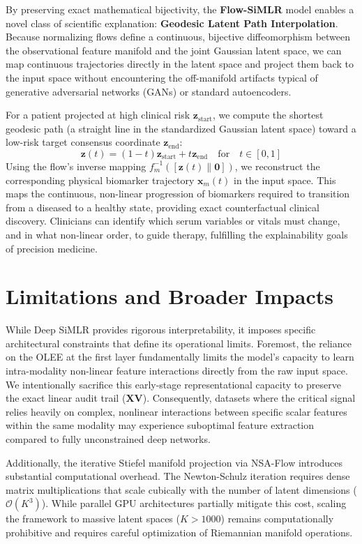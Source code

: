 \documentclass[
  letterpaper,
]{report}
\begin{document}
By preserving exact mathematical bijectivity, the \textbf{Flow-SiMLR}
model enables a novel class of scientific explanation: \textbf{Geodesic
Latent Path Interpolation}. Because normalizing flows define a
continuous, bijective diffeomorphism between the observational feature
manifold and the joint Gaussian latent space, we can map continuous
trajectories directly in the latent space and project them back to the
input space without encountering the off-manifold artifacts typical of
generative adversarial networks (GANs) or standard autoencoders.

For a patient projected at high clinical risk
\(\mathbf{z}_{\text{start}}\), we compute the shortest geodesic path (a
straight line in the standardized Gaussian latent space) toward a
low-risk target consensus coordinate \(\mathbf{z}_{\text{end}}\):
\[\mathbf{z}(t) = (1 - t)\mathbf{z}_{\text{start}} + t\mathbf{z}_{\text{end}} \quad \text{for} \quad t \in [0, 1]\]
Using the flow's inverse mapping
\(f_m^{-1}([\mathbf{z}(t) \parallel \mathbf{0}])\), we reconstruct the
corresponding physical biomarker trajectory \(\mathbf{x}_m(t)\) in the
input space. This maps the continuous, non-linear progression of
biomarkers required to transition from a diseased to a healthy state,
providing exact counterfactual clinical discovery. Clinicians can
identify which serum variables or vitals must change, and in what
non-linear order, to guide therapy, fulfilling the explainability goals
of precision medicine.

\section{Limitations and Broader
Impacts}\label{limitations-and-broader-impacts}

While Deep SiMLR provides rigorous interpretability, it imposes specific
architectural constraints that define its operational limits. Foremost,
the reliance on the OLEE at the first layer fundamentally limits the
model's capacity to learn intra-modality non-linear feature interactions
directly from the raw input space. We intentionally sacrifice this
early-stage representational capacity to preserve the exact linear audit
trail (\(\mathbf{X}\mathbf{V}\)). Consequently, datasets where the
critical signal relies heavily on complex, nonlinear interactions
between specific scalar features within the same modality may experience
suboptimal feature extraction compared to fully unconstrained deep
networks.

Additionally, the iterative Stiefel manifold projection via NSA-Flow
introduces substantial computational overhead. The Newton-Schulz
iteration requires dense matrix multiplications that scale cubically
with the number of latent dimensions (\(\mathcal{O}(K^3)\)). While
parallel GPU architectures partially mitigate this cost, scaling the
framework to massive latent spaces (\(K > 1000\)) remains
computationally prohibitive and requires careful optimization of
Riemannian manifold operations.
\end{document}
